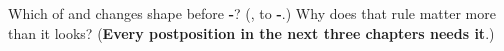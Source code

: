 \begin{tcolorbox}[breakable,colback=teal!4,colframe=teal!35!black,title={Before you move on}]
Which of \textbf{} and \textbf{} changes shape before \textbf{-}? (\textbf{}, to \textbf{-}.) Why does that rule matter more than it looks? (\textbf{Every postposition in the next three chapters needs it}.)
\end{tcolorbox}
